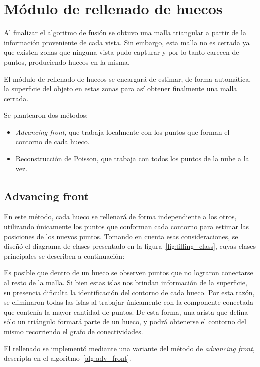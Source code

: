 \section{Módulo de rellenado de huecos}
	Al finalizar el algoritmo de fusión se obtuvo una malla triangular a partir
	de la información proveniente de cada vista.
	Sin embargo, esta malla no es cerrada ya que existen zonas que ninguna
	vista pudo capturar y por lo tanto carecen de puntos, produciendo huecos en la misma.

	El módulo de rellenado de huecos se encargará de estimar, de forma automática, la superficie del
	objeto en estas zonas para así obtener finalmente una malla cerrada.

	Se plantearon dos métodos:
	\begin{itemize}
		\item \emph{Advancing front}, que trabaja localmente con los puntos que forman el contorno de cada hueco.
		\item Reconstrucción de Poisson, que trabaja con todos los puntos de la nube a la vez. 
	\end{itemize}


	\subsection{Advancing front}
		En este método, cada hueco se rellenará de forma independiente a los otros,
		utilizando únicamente los puntos que conforman cada contorno para estimar
		las posiciones de los nuevos puntos.
		Tomando en cuenta esas consideraciones, se diseñó el diagrama de clases presentado en la figura~\ref{fig:filling_class},
		cuyas clases principales se describen a continuación:

		Es posible que dentro de un hueco se observen puntos que no lograron
		conectarse al resto de la malla.  Si bien estas islas nos brindan
		información de la superficie, su presencia dificulta la identificación
		del contorno de cada hueco.  Por esta razón, se eliminaron todas las
		islas al trabajar únicamente con la componente conectada que contenía
		la mayor cantidad de puntos.
		De esta forma, una arista que defina sólo un triángulo formará parte de un hueco,
		y podrá obtenerse el contorno del mismo recorriendo el grafo de conectividades. 

		El rellenado se implementó mediante una variante del método de
		\emph{advancing front}\cite{advance_front}, descripta en el
		algoritmo~\ref{alg:adv_front}.

